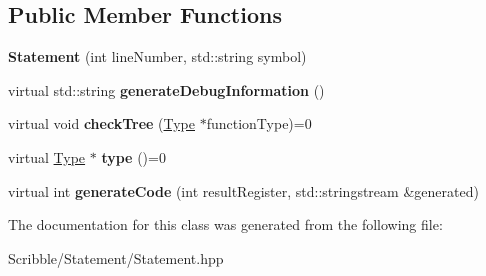 \subsection*{Public Member Functions}
\begin{DoxyCompactItemize}
\item 
\hypertarget{class_statement_a7bb394d02364daca85fc5f39675d9a01}{{\bfseries Statement} (int line\-Number, std\-::string symbol)}\label{class_statement_a7bb394d02364daca85fc5f39675d9a01}

\item 
\hypertarget{class_statement_acdeb057daeb30780a49b9cc7654acef6}{virtual std\-::string {\bfseries generate\-Debug\-Information} ()}\label{class_statement_acdeb057daeb30780a49b9cc7654acef6}

\item 
\hypertarget{class_statement_a81817701cd45b9ea374f4d1a9239312a}{virtual void {\bfseries check\-Tree} (\hyperlink{class_type}{Type} $\ast$function\-Type)=0}\label{class_statement_a81817701cd45b9ea374f4d1a9239312a}

\item 
\hypertarget{class_statement_a2c94705cd243cae0f7d32c83cecaa499}{virtual \hyperlink{class_type}{Type} $\ast$ {\bfseries type} ()=0}\label{class_statement_a2c94705cd243cae0f7d32c83cecaa499}

\item 
\hypertarget{class_statement_ac597c3763c1f8e81040cac93e2ba04a9}{virtual int {\bfseries generate\-Code} (int result\-Register, std\-::stringstream \&generated)}\label{class_statement_ac597c3763c1f8e81040cac93e2ba04a9}

\end{DoxyCompactItemize}


The documentation for this class was generated from the following file\-:\begin{DoxyCompactItemize}
\item 
Scribble/\-Statement/Statement.\-hpp\end{DoxyCompactItemize}
